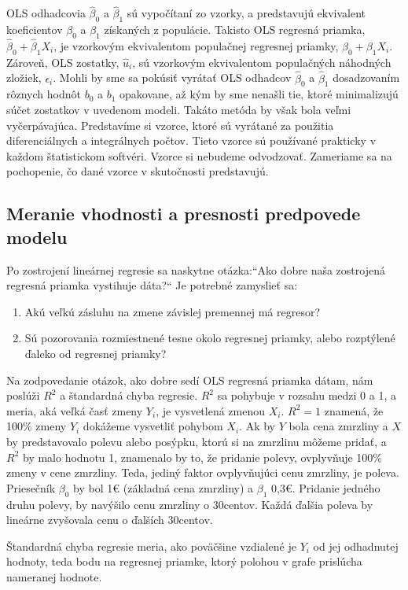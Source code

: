 \documentclass[]{tukediphc}
\begin{document}
OLS odhadcovia $\hat\beta_0$ a $\hat\beta_1$ sú vypočítaní zo vzorky, a predstavujú ekvivalent koeficientov $\beta_0$ a $\beta_1$ získaných z populácie. Takisto OLS regresná priamka, $\hat\beta_0 + \hat\beta_{1}X_i$, je vzorkovým ekvivalentom populačnej regresnej priamky, $\beta_0 + \beta_{1}X_i$. Zároveň, OLS zostatky, $\hat{u}_i$, sú vzorkovým ekvivalentom populačných náhodných zložiek, $\epsilon_i$. Mohli by sme sa pokúsiť vyrátať OLS odhadcov $\hat\beta_0$ a $\hat\beta_1$ dosadzovaním rôznych hodnôt $b_0$ a $b_1$ opakovane, až kým by sme nenašli tie, ktoré minimalizujú súčet zostatkov v uvedenom modeli. Takáto metóda by však bola veľmi vyčerpávajúca. Predstavíme si vzorce, ktoré sú vyrátané za použitia diferenciálnych a integrálnych počtov. Tieto vzorce sú používané prakticky v každom štatistickom softvéri. Vzorce si nebudeme odvodzovať. Zameriame sa na pochopenie, čo dané vzorce v skutočnosti predstavujú. 

\subsection{Meranie vhodnosti a presnosti predpovede modelu}

Po zostrojení lineárnej regresie sa naskytne otázka:“Ako dobre naša zostrojená regresná priamka vystihuje dáta?“ Je potrebné zamyslieť sa: 
\begin{enumerate}
\item Akú veľkú zásluhu na zmene závislej premennej má regresor?  
\item Sú pozorovania rozmiestnené tesne okolo regresnej priamky, alebo rozptýlené ďaleko od regresnej priamky?
\end{enumerate}
Na zodpovedanie otázok, ako dobre sedí OLS regresná priamka dátam, nám poslúži $R^2$ a štandardná chyba regresie. $R^2$ sa pohybuje v rozsahu medzi 0 a 1, a meria, aká veľká časť zmeny $Y_i$, je vysvetlená zmenou $X_i$. $R^2 = 1$ znamená, že 100\% zmeny $Y_i$ dokážeme vysvetliť pohybom $X_i$. Ak by $Y$ bola cena zmrzliny a $X$ by predstavovalo polevu alebo posýpku, ktorú si na zmrzlinu môžeme pridať, a $R^2$ by malo hodnotu 1, znamenalo by to, že pridanie polevy, ovplyvňuje 100\% zmeny v cene zmrzliny. Teda, jediný faktor ovplyvňujúci cenu zmrzliny, je poleva. Priesečník $\beta_0$ by bol 1€ (základná cena zmrzliny) a $\beta_1$ 0,3€. Pridanie jedného druhu polevy, by navýšilo cenu zmrzliny o 30centov. Každá ďalšia poleva by lineárne zvyšovala cenu o ďalších 30centov. 

Štandardná chyba regresie meria, ako poväčšine vzdialené je $Y_i$ od jej odhadnutej hodnoty, teda bodu na regresnej priamke, ktorý polohou v grafe prislúcha nameranej hodnote.  
\end{document}
